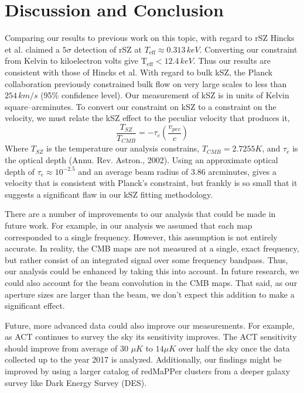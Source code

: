 \documentclass{princeton_astro_thesis}
\begin{document}
\chapter{Discussion and Conclusion}
\par Comparing our results to previous work on this topic, with regard to rSZ Hincks et al. claimed a $5\sigma$ detection of rSZ at $T_\mathrm{eff}\approx 0.313\, keV$. Converting our constraint from Kelvin to kiloelectron volts give $\mathrm{T_{eff}}<12.4 \, keV$. Thus our results are consistent with those of Hincks et al. With regard to bulk kSZ, the Planck collaboration previously constrained bulk flow on very large scales to less than $254\, km/s$ (95\% confidence level). Our measurement of kSZ is in units of Kelvin square--arcminutes. To convert our constraint on kSZ to a constraint on the velocity, we must relate the kSZ effect to the peculiar velocity that produces it,
\begin{equation}
\frac{T_{SZ}}{T_{CMB}}=-\tau_e\left(\frac{v_{pec}}{c}\right)
\end{equation}
Where $T_{SZ}$ is the temperature our analysis constrains, $T_{CMB}=2.7255 K$, and $\tau_e$ is the optical depth (Annu. Rev. Astron., 2002). Using an approximate optical depth of $\tau_e\approx10^{-2.5}$ and an average beam radius of $3.86$ arcminutes, gives a velocity that is consistent with Planck's constraint, but frankly is so small that it suggests a significant flaw in our kSZ fitting methodology.
\par There are a number of improvements to our analysis that could be made in future work. For example, in our analysis we assumed that each map corresponded to a single frequency. However, this assumption is not entirely accurate. In reality, the CMB maps are not measured at a single, exact frequency, but rather consist of an integrated signal over some frequency bandpass. Thus, our analysis could be enhanced by taking this into account. In future research, we could also account for the beam convolution in the CMB maps. That said, as our aperture sizes are larger than the beam, we don't expect this addition to make a significant effect.
\par Future, more advanced data could also improve our measurements. For example, as ACT continues to survey the sky its sensitivity improves. The ACT sensitivity should improve from average of 30 $\mu K$ to $14 \mu K$ over half the sky once the data collected up to the year 2017 is analyzed. Additionally, our findings might be improved by using a larger catalog of redMaPPer clusters from a deeper galaxy survey like Dark Energy Survey (DES).
\end{document}

